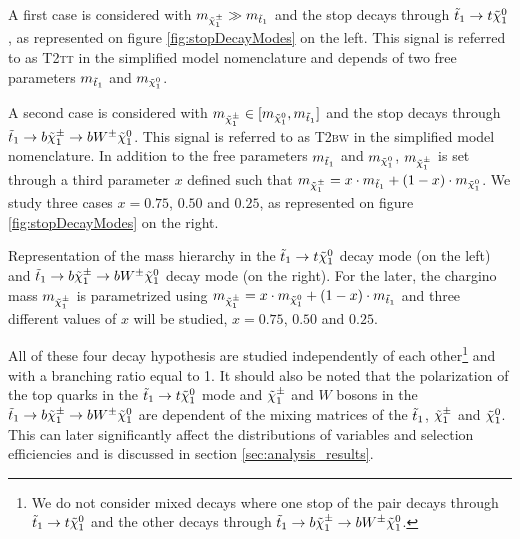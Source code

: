         A first case is considered with $m_{\tilde{\chi}_1^\pm} \gg m_{\tilde{t}_1}$ and the stop 
        decays through $\tilde{t}_1 \rightarrow t \tilde{\chi}_1^0$, as represented on figure 
        \ref{fig:stopDecayModes} on the left. This signal is referred to as \textsc{T2tt} 
        in the simplified model nomenclature and depends of two free parameters 
        $m_{\tilde{t}_1}$ and $m_{\tilde{\chi}_1^0}$.

        A second case is considered with $m_{\tilde{\chi}_1^\pm} \in [m_{\tilde{\chi}_1^0}, 
        m_{\tilde{t}_1}]$ and the stop decays through $\tilde{t}_1 \rightarrow b \tilde{\chi}_1^\pm 
        \rightarrow b W^{\pm} \tilde{\chi}_1^0$. This signal is referred to as \textsc{T2bw} 
        in the simplified model nomenclature. In addition to the free  parameters 
        $m_{\tilde{t}_1}$ and $m_{\tilde{\chi}_1^0}$, $m_{\tilde{\chi}_1^\pm}$ is set through a 
        third parameter $x$ defined such that $m_{\tilde{\chi}_1^\pm} = x \cdot m_{\tilde{t}_1} 
        + (1 - x) \cdot m_{\tilde{\chi}_1^0}$. We study three cases $x = 0.75$, $0.50$ 
        and $0.25$, as represented on figure \ref{fig:stopDecayModes} on the right.

                     {Representation of the mass hierarchy in the $\tilde{t}_1 \rightarrow t 
                     \tilde{\chi}_1^0$ decay mode (on the left) and $\tilde{t}_1 \rightarrow b 
                     \tilde{\chi}_1^\pm \rightarrow b W^{\pm} \tilde{\chi}_1^0 $ decay mode (on the 
                     right). For the later, the chargino mass $m_{\tilde{\chi}_1^\pm}$ is 
                     parametrized using $m_{\tilde{\chi}_1^\pm} = x \cdot m_{\tilde{\chi}_1^0} 
                     + (1 - x) \cdot m_{\tilde{t}_1}$ and three different values of $x$ will
                     be studied, $x = 0.75$, $0.50$ and $0.25$.} 

        All of these four decay hypothesis are studied independently
        of each other\footnote{We do not consider mixed decays where one stop of the pair 
        decays through $\tilde{t}_1 \rightarrow t \tilde{\chi}_1^0$ and the other decays through 
        $\tilde{t}_1 \rightarrow b \tilde{\chi}_1^\pm \rightarrow b W^{\pm} \tilde{\chi}_1^0$.} and with a 
        branching ratio equal to 1. It should also be noted that the polarization of the 
        top quarks in the $\tilde{t}_1 \rightarrow t \tilde{\chi}_1^0$ mode and $\tilde{\chi}_1^\pm$ and 
        $W$ bosons in the $\tilde{t}_1 \rightarrow b \tilde{\chi}_1^\pm \rightarrow b W^{\pm} 
        \tilde{\chi}_1^0$ are dependent of the mixing matrices of the $\tilde{t}_1$, $\tilde{\chi}_1^\pm$ 
        and $\tilde{\chi}_1^0$. This can later significantly affect the distributions of 
        variables and selection efficiencies and is discussed in section 
        \ref{sec:analysis_results}.

